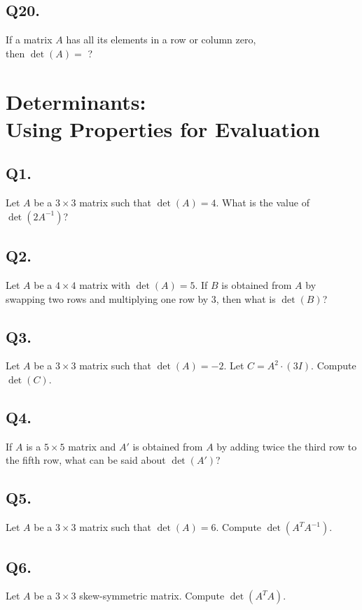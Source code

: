 \subsection*{Q20.}
If a matrix $A$ has all its elements in a row or column zero,\\ then $\det(A) = $ ?

\newpage
\section[Determinants: Using Properties for Evaluation]
{Determinants:\\ Using Properties for Evaluation}

\subsection*{Q1.}
Let $A$ be a $3 \times 3$ matrix such that $\det(A) = 4$. What is the value of $\det(2A^{-1})$?

\subsection*{Q2.}
Let $A$ be a $4 \times 4$ matrix with $\det(A) = 5$. If $B$ is obtained from $A$ by swapping two rows and multiplying one row by $3$, then what is $\det(B)$?

\subsection*{Q3.}
Let $A$ be a $3 \times 3$ matrix such that $\det(A) = -2$. Let $C = A^2 \cdot (3I)$. Compute $\det(C)$.

\subsection*{Q4.}
If $A$ is a $5 \times 5$ matrix and $A'$ is obtained from $A$ by adding twice the third row to the fifth row, what can be said about $\det(A')$?

\subsection*{Q5.}
Let $A$ be a $3 \times 3$ matrix such that $\det(A) = 6$. Compute $\det(A^T A^{-1})$.

\subsection*{Q6.}
Let $A$ be a $3 \times 3$ skew-symmetric matrix. Compute $\det(A^T A)$.

